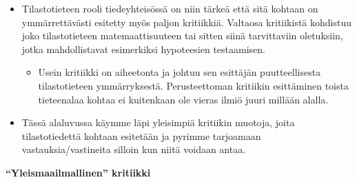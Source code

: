 \documentclass[
]{book}
\providecommand{\tightlist}{%
  \setlength{\itemsep}{0pt}\setlength{\parskip}{0pt}}
\begin{document}
\begin{itemize}
\tightlist
\item
  Tilastotieteen rooli tiedeyhteisössä on niin tärkeä että sitä kohtaan on ymmärrettävästi esitetty myös paljon kritiikkiä. Valtaosa kritiikistä kohdistuu joko tilastotieteen matemaattisuuteen tai sitten siinä tarvittaviin oletuksiin, jotka mahdollistavat esimerkiksi hypoteesien testaamisen.

  \begin{itemize}
  \tightlist
  \item
    Usein kritiikki on aiheetonta ja johtuu sen esittäjän puutteellisesta tilastotieteen ymmärryksestä. Perusteettoman kritiikin esittäminen toista tieteenalaa kohtaa ei kuitenkaan ole vieras ilmiö juuri millään alalla.
  \end{itemize}
\item
  Tässä alaluvussa käymme läpi yleisimpiä kritiikin muotoja, joita tilastotiedettä kohtaan esitetään ja pyrimme tarjoamaan vastauksia/vastineita silloin kun niitä voidaan antaa.
\end{itemize}

\hfill\break
\hfill\break

\textbf{``Yleismaailmallinen'' kritiikki}
\end{document}
